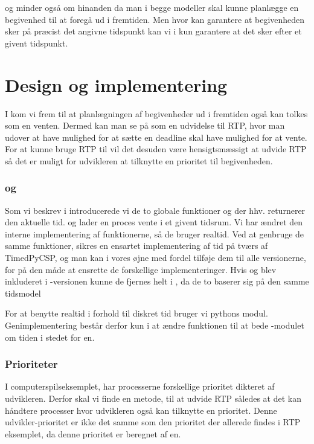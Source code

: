 \is og \des minder også om hinanden da man i begge modeller skal kunne planlægge en begivenhed til at foregå ud i fremtiden. Men hvor \des kan garantere at begivenheden sker på præcist det angivne tidspunkt kan vi i \is kun garantere at det sker efter et givent tidspunkt.


\section{Design og implementering}
I \des kom vi frem til at planlægningen af begivenheder ud i fremtiden også kan tolkes som en venten. Dermed kan man se på \is som en udvidelse til RTP, hvor man udover at have mulighed for at sætte en deadline skal have mulighed for at vente. For at kunne bruge RTP til \is vil det desuden være hensigtsmæssigt at  udvide RTP så det er muligt for udvikleren at tilknytte en prioritet til begivenheden.

\subsubsection{ og }
Som vi beskrev i \des introducerede vi de to globale funktioner  og  der hhv. returnerer den aktuelle tid. og lader en proces vente i et givent tidsrum. Vi har ændret den interne implementering af funktionerne, så de bruger realtid. Ved at genbruge de samme funktioner, sikres en ensartet implementering af tid på tværs af TimedPyCSP, og man kan i vores øjne med fordel tilføje dem til alle \pycsp versionerne, for på den måde at ensrette de forskellige implementeringer. Hvis  og  blev inkluderet i -versionen kunne de fjernes helt i \is, da de to baserer sig på den samme tidsmodel

 
For at benytte realtid i forhold til diskret tid bruger vi pythons  modul. Genimplementering består derfor kun i at ændre funktionen  til at bede -modulet om tiden i stedet for \sched en.

\subsubsection{Prioriteter}

I computerspilseksemplet, har processerne forskellige prioritet dikteret af udvikleren. Derfor skal vi finde en metode, til at udvide RTP således at det kan håndtere processer hvor udvikleren også kan tilknytte en prioritet. Denne udvikler-prioritet er ikke det samme som den prioritet der allerede findes i RTP eksemplet, da denne prioritet er beregnet af \sched en.


